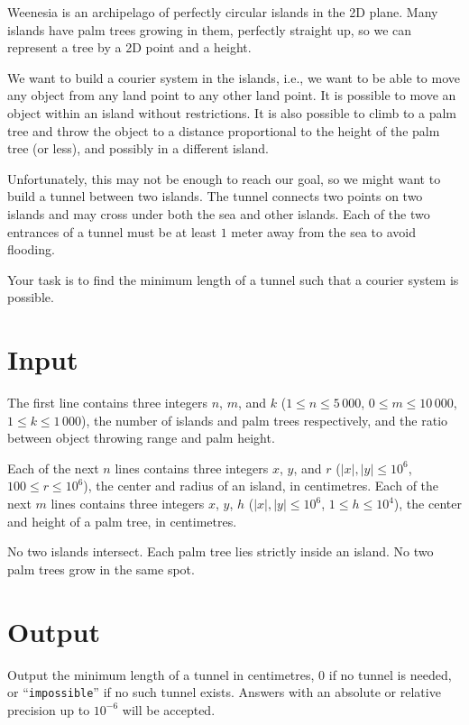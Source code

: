 
%

Weenesia is an archipelago of perfectly circular islands in the 2D
plane. Many islands have palm trees growing in them, perfectly
straight up, so we can represent a tree by a 2D point and a height.

We want to build a courier system in the islands, i.e., we want to be
able to move any object from any land point to any other land
point. It is possible to move an object within an island without
restrictions. It is also possible to climb to a palm tree and throw
the object to a distance proportional to the height of the palm tree
(or less), and possibly in a different island.

Unfortunately, this may not be enough to reach our goal, so we might
want to build a tunnel between two islands. The tunnel connects two
points on two islands and may cross under both the sea and other
islands. Each of the two entrances of a tunnel must be at least $1$
meter away from the sea to avoid flooding.

Your task is to find the minimum length of a tunnel such that a
courier system is possible.

\section*{Input}

The first line contains three integers $n$, $m$, and $k$
($1 \leq n \leq 5\,000$, $0 \leq m \leq 10\,000$,
$1 \leq k \leq 1\,000$), the number of islands and palm trees
respectively, and the ratio between object throwing range and palm
height.

Each of the next $n$ lines contains three integers $x$, $y$, and $r$
($|x|,|y|\leq 10^6$, $100 \leq r \leq 10^6$), the center and radius of
an island, in centimetres. Each of the next $m$ lines contains three
integers $x$, $y$, $h$ ($|x|,|y|\leq 10^6$, $1 \leq h \leq 10^4$), the center and height of a palm tree, in
centimetres.

No two islands intersect. Each palm tree lies strictly inside an
island. No two palm trees grow in the same spot.

\section*{Output}

Output the minimum length of a tunnel in centimetres, $0$ if no tunnel
is needed, or ``\texttt{impossible}'' if no such tunnel
exists. Answers with an absolute or relative precision up to $10^{-6}$
will be accepted.

